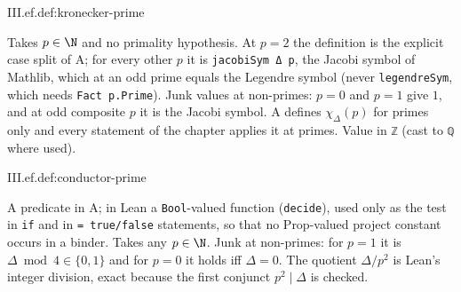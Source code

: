 \begin{definition}
\end{definition}
\begin{tfformal}{III.ef.def:kronecker-prime}
\begin{tffidelity}
Takes $p\in\N$ and no primality hypothesis. At $p=2$ the definition is the explicit case split of A; for every other $p$ it is \texttt{jacobiSym Δ p}, the Jacobi symbol of Mathlib, which at an odd prime equals the Legendre symbol (never \texttt{legendreSym}, which needs \texttt{Fact p.Prime}). Junk values at non-primes: $p=0$ and $p=1$ give $1$, and at odd composite $p$ it is the Jacobi symbol. A defines $\chi_\Delta(p)$ for primes only and every statement of the chapter applies it at primes. Value in \texttt{ℤ} (cast to \texttt{ℚ} where used).
\end{tffidelity}
\end{tfformal}

\begin{definition}
\end{definition}
\begin{tfformal}{III.ef.def:conductor-prime}
\begin{tffidelity}
A predicate in A; in Lean a \texttt{Bool}-valued function (\texttt{decide}), used only as the test in \texttt{if} and in \texttt{= true/false} statements, so that no Prop-valued project constant occurs in a binder. Takes any $p\in\N$. Junk at non-primes: for $p=1$ it is $\Delta\bmod4\in\{0,1\}$ and for $p=0$ it holds iff $\Delta=0$. The quotient $\Delta/p^2$ is Lean's integer division, exact because the first conjunct $p^2\mid\Delta$ is checked.
\end{tffidelity}
\end{tfformal}

